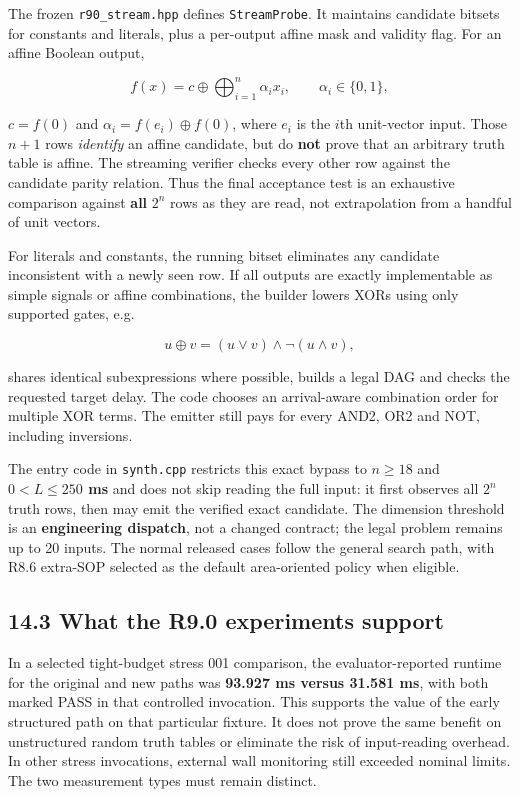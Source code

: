 \documentclass[a4paper,10pt]{article}
\theoremstyle{definition}
\theoremstyle{remark}
\newcounter{problem}
\begin{document}
The frozen \texttt{r90\_stream.hpp} defines \texttt{StreamProbe}. It maintains candidate bitsets for constants and literals, plus a per-output affine mask and validity flag. For an affine Boolean output,

\[
f(x)=c\oplus\bigoplus_{i=1}^{n}\alpha_i x_i,
\qquad \alpha_i\in\{0,1\},
\]

\(c=f(0)\) and \(\alpha_i=f(e_i)\oplus f(0)\), where \(e_i\) is the \(i\)th unit-vector input. Those \(n+1\) rows \emph{identify} an affine candidate, but do \textbf{not} prove that an arbitrary truth table is affine. The streaming verifier checks every other row against the candidate parity relation. Thus the final acceptance test is an exhaustive comparison against \textbf{all} \(2^n\) rows as they are read, not extrapolation from a handful of unit vectors.

For literals and constants, the running bitset eliminates any candidate inconsistent with a newly seen row. If all outputs are exactly implementable as simple signals or affine combinations, the builder lowers XORs using only supported gates, e.g.

\[
u\oplus v=(u\lor v)\land\neg(u\land v),
\]

shares identical subexpressions where possible, builds a legal DAG and checks the requested target delay. The code chooses an arrival-aware combination order for multiple XOR terms. The emitter still pays for every AND2, OR2 and NOT, including inversions.

The entry code in \texttt{synth.cpp} restricts this exact bypass to \textbf{\(n\ge18\)} and \textbf{\(0<L\le250\) ms} and does not skip reading the full input: it first observes all \(2^n\) truth rows, then may emit the verified exact candidate. The dimension threshold is an \textbf{engineering dispatch}, not a changed contract; the legal problem remains up to 20 inputs. The normal released cases follow the general search path, with R8.6 extra-SOP selected as the default area-oriented policy when eligible.

\subsection{14.3 What the R9.0 experiments support}\label{what-the-r9.0-experiments-support}

In a selected tight-budget stress 001 comparison, the evaluator-reported runtime for the original and new paths was \textbf{93.927 ms versus 31.581 ms}, with both marked PASS in that controlled invocation. This supports the value of the early structured path on that particular fixture. It does not prove the same benefit on unstructured random truth tables or eliminate the risk of input-reading overhead. In other stress invocations, external wall monitoring still exceeded nominal limits. The two measurement types must remain distinct.
\end{document}

